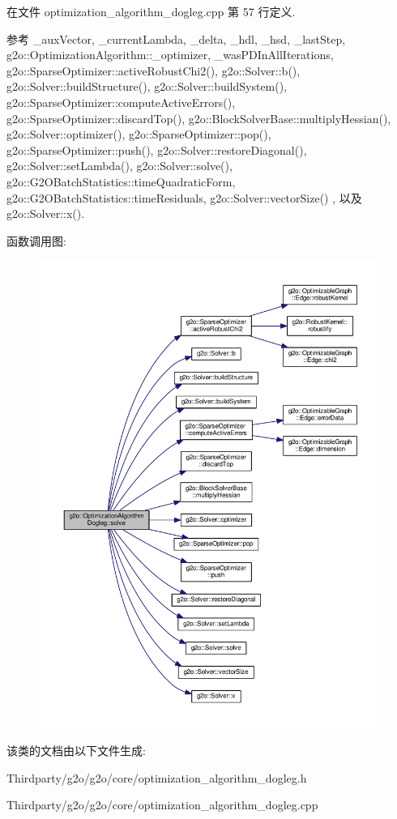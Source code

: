 在文件 optimization\-\_\-algorithm\-\_\-dogleg.\-cpp 第 57 行定义.



参考 \-\_\-aux\-Vector, \-\_\-current\-Lambda, \-\_\-delta, \-\_\-hdl, \-\_\-hsd, \-\_\-last\-Step, g2o\-::\-Optimization\-Algorithm\-::\-\_\-optimizer, \-\_\-was\-P\-D\-In\-All\-Iterations, g2o\-::\-Sparse\-Optimizer\-::active\-Robust\-Chi2(), g2o\-::\-Solver\-::b(), g2o\-::\-Solver\-::build\-Structure(), g2o\-::\-Solver\-::build\-System(), g2o\-::\-Sparse\-Optimizer\-::compute\-Active\-Errors(), g2o\-::\-Sparse\-Optimizer\-::discard\-Top(), g2o\-::\-Block\-Solver\-Base\-::multiply\-Hessian(), g2o\-::\-Solver\-::optimizer(), g2o\-::\-Sparse\-Optimizer\-::pop(), g2o\-::\-Sparse\-Optimizer\-::push(), g2o\-::\-Solver\-::restore\-Diagonal(), g2o\-::\-Solver\-::set\-Lambda(), g2o\-::\-Solver\-::solve(), g2o\-::\-G2\-O\-Batch\-Statistics\-::time\-Quadratic\-Form, g2o\-::\-G2\-O\-Batch\-Statistics\-::time\-Residuals, g2o\-::\-Solver\-::vector\-Size() , 以及 g2o\-::\-Solver\-::x().



函数调用图\-:
\nopagebreak
\begin{figure}[H]
\begin{center}
\leavevmode
\includegraphics[width=350pt]{classg2o_1_1OptimizationAlgorithmDogleg_ace62fd809c18655bd7ff104285748610_cgraph}
\end{center}
\end{figure}




该类的文档由以下文件生成\-:\begin{DoxyCompactItemize}
\item 
Thirdparty/g2o/g2o/core/optimization\-\_\-algorithm\-\_\-dogleg.\-h\item 
Thirdparty/g2o/g2o/core/optimization\-\_\-algorithm\-\_\-dogleg.\-cpp\end{DoxyCompactItemize}
